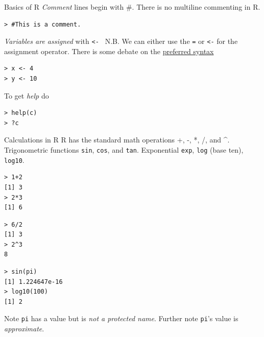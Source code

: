 \documentclass[xcolor=svgnames, 10pt]{beamer}
\begin{document}
\begin{frame}[fragile]{Basics of R}
\vfill
\emph{Comment} lines begin with \#.  There is no multiline commenting in R.
\begin{Verbatim}[xleftmargin=2em, xrightmargin=1.5em]
> #This is a comment.
\end{Verbatim}
\vfill
\emph{Variables are assigned} with {\tt <- }  N.B. We can either use the {\tt =} or {\tt <-} for the assignment operator.  There is some debate on the \href{https://csgillespie.wordpress.com/2010/11/16/assignment-operators-in-r-vs/}{preferred syntax}

\begin{Verbatim}[xleftmargin=2em, xrightmargin=1.5em]
> x <- 4
> y <- 10
\end{Verbatim}
\vfill
To get \emph{help} do
\begin{Verbatim}[xleftmargin=2em, xrightmargin=1.5em]
> help(c)
> ?c
\end{Verbatim}
\vfill
\end{frame}


\begin{frame}[fragile]{Calculations in R}
R has the standard math operations +, -, *, /, and \textasciicircum{}.  Trigonometric functions \texttt{sin}, \texttt{cos}, and \texttt{tan}.  Exponential \texttt{exp}, \texttt{log} (base ten), \texttt{log10}.
\begin{multicols}{3}
\begin{Verbatim}[frame=single, xleftmargin=.5em, xrightmargin=.5em, commandchars=\\\{\}]
> 1+2
[1] 3
> 2*3
[1] 6
\end{Verbatim}
\newpage
\begin{Verbatim}[frame=single, xleftmargin=.5em, xrightmargin=.5em, commandchars=\\\{\}]
> 6/2
[1] 3
> 2^3
8
\end{Verbatim}
\newpage
\begin{Verbatim}[frame=single, xleftmargin=.5em, xrightmargin=0em, commandchars=\\\{\}]
> sin(pi)
[1] 1.224647e-16
> log10(100)
[1] 2
\end{Verbatim}
\end{multicols}
Note \texttt{pi} has a value but is \emph{not a protected name}.  Further note \texttt{pi}'s value is \emph{approximate}.
\end{frame}
\end{document}
